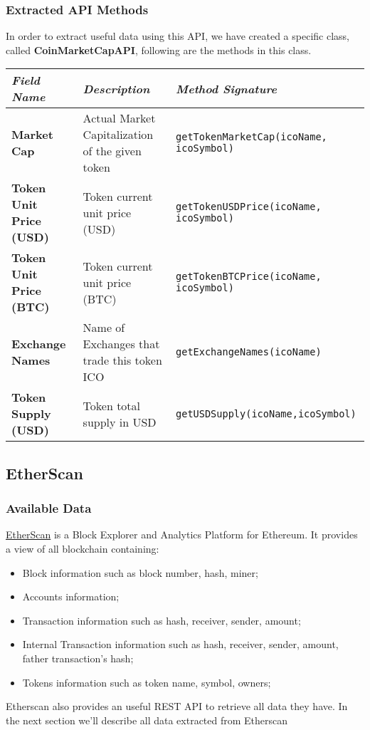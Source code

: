 \subsubsection{Extracted API Methods}
In order to extract useful data using this API, we have created a specific class, called \textbf{CoinMarketCapAPI}, following are the methods in this class.
\begin{center}
\begin{tabular}{| C{2cm} | C{4cm} | C{7cm} |} \hline
    \textit{Field Name} & \textit{Description} & \textit{Method Signature}\\ \hline 
    \textbf{Market Cap} & Actual Market Capitalization of the given token &
    \texttt{getTokenMarketCap(icoName, icoSymbol)}\\ \hline
    \textbf{Token Unit Price (USD)} & Token current unit price (USD) &
    \texttt{getTokenUSDPrice(icoName, icoSymbol)}\\ \hline
    \textbf{Token Unit Price (BTC)} & Token current unit price (BTC) &
    \texttt{getTokenBTCPrice(icoName, icoSymbol)}\\ \hline 
    \textbf{Exchange Names} & Name of Exchanges that trade this token ICO &
    \texttt{getExchangeNames(icoName)}\\ \hline 
    \textbf{Token Supply (USD)} & Token total supply in USD &
    \texttt{getUSDSupply(icoName,icoSymbol)}\\ \hline
\end{tabular}
\end{center}

\subsection{EtherScan}
\label{etherscan}
\subsubsection{Available Data}
\href{https://etherscan.io/}{EtherScan} is a Block Explorer and Analytics Platform for Ethereum.
It provides a view of all blockchain containing:
\begin{itemize}
    \item Block information such as block number, hash, miner;
    \item Accounts information;
    \item Transaction information such as hash, receiver, sender, amount;
    \item Internal Transaction information such as hash, receiver, sender, amount, father transaction's hash;
    \item Tokens information such as token name, symbol, owners;
\end{itemize}
Etherscan also provides an useful REST API to retrieve all data they have. In the next section we'll describe all data extracted from Etherscan
